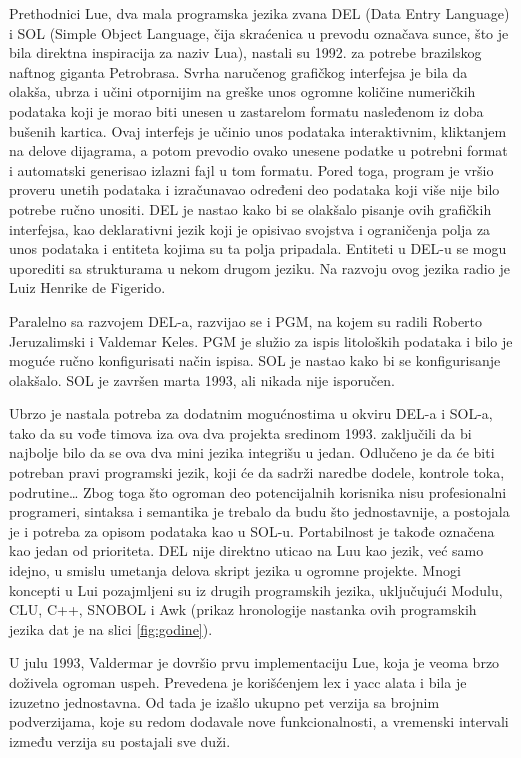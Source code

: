 \documentclass[a4paper]{article}
\begin{document}
Prethodnici Lue, dva mala programska jezika zvana DEL (Data Entry Language) i SOL (Simple Object Language, čija skraćenica u prevodu označava sunce, što je bila direktna inspiracija za naziv Lua), nastali su 1992. za potrebe brazilskog naftnog giganta Petrobrasa. Svrha naručenog grafičkog interfejsa je bila da olakša, ubrza i učini otpornijim na greške unos ogromne količine numeričkih podataka koji je morao biti unesen u zastarelom formatu nasleđenom iz doba bušenih kartica. Ovaj interfejs je učinio unos podataka interaktivnim, kliktanjem na delove dijagrama, a potom prevodio ovako unesene podatke u potrebni format i automatski generisao izlazni fajl u tom formatu. Pored toga, program je vršio proveru unetih podataka i izračunavao određeni deo podataka koji više nije bilo potrebe ručno unositi. DEL je nastao kako bi se olakšalo pisanje ovih grafičkih interfejsa, kao deklarativni jezik koji je opisivao svojstva i ograničenja polja za unos podataka i entiteta kojima su ta polja pripadala. Entiteti u DEL-u se mogu uporediti sa strukturama u nekom drugom jeziku. Na razvoju ovog jezika radio je Luiz Henrike de Figerido.

Paralelno sa razvojem DEL-a, razvijao se i PGM, na kojem su radili Roberto Jeruzalimski i Valdemar Keles. PGM je služio za ispis litoloških podataka i bilo je moguće ručno konfigurisati način ispisa. SOL je nastao kako bi se konfigurisanje olakšalo. SOL je završen marta 1993, ali nikada nije isporučen.

Ubrzo je nastala potreba za dodatnim mogućnostima u okviru DEL-a i SOL-a, tako da su vođe timova iza ova dva projekta sredinom 1993. zaključili da bi najbolje bilo da se ova dva mini jezika integrišu u jedan. Odlučeno je da će biti potreban pravi programski jezik, koji će da sadrži naredbe dodele, kontrole toka, podrutine… Zbog toga što ogroman deo potencijalnih korisnika nisu profesionalni programeri, sintaksa i semantika je trebalo da budu što jednostavnije, a postojala je i potreba za opisom podataka kao u SOL-u. Portabilnost je takođe označena kao jedan od prioriteta. DEL nije direktno uticao na Luu kao jezik, već samo idejno, u smislu umetanja delova skript jezika u ogromne projekte. Mnogi koncepti u Lui pozajmljeni su iz drugih programskih jezika, uključujući Modulu, CLU, C++, SNOBOL i Awk (prikaz hronologije nastanka ovih programskih jezika dat je na slici \ref{fig:godine}). %

U julu 1993, Valdermar je dovršio prvu implementaciju Lue, koja je veoma brzo doživela ogroman uspeh. Prevedena je korišćenjem lex i yacc alata i bila je izuzetno jednostavna. Od tada je izašlo ukupno pet verzija sa brojnim podverzijama, koje su redom dodavale nove funkcionalnosti, a vremenski intervali između verzija su postajali sve duži. 
 
\end{document}
